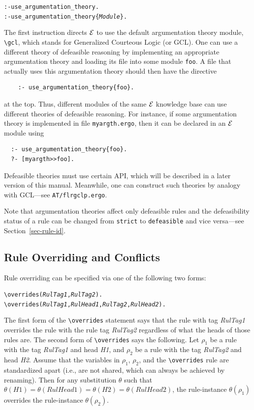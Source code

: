 \documentclass[11pt]{article}
\newcommand{\ERGO}{\mbox{\ensuremath{\cal{E}}\smaller{{\sc{RGO}}}}\xspace}
\newcommand{\FLSYSTEM}{\ERGO}
\newcommand{\ergoext}{ergo\xspace}
\newcommand{\bs}{\textbackslash}
\begin{document}
\begin{alltt}
  :- use_argumentation_theory.
  :- use_argumentation_theory\{\emph{Module}\}.
\end{alltt}
\index{\bs{}gcl module}
The first instruction directs \FLSYSTEM to use the default argumentation theory
module, {\tt \bs{}gcl}, which stands for Generalized Courteous Logic (or GCL).
One can use a different theory of defeasible reasoning by implementing an
appropriate argumentation theory and
loading its file into some module {\tt foo}.
A file that actually uses this argumentation theory should then have
the directive
\begin{verbatim}
    :- use_argumentation_theory{foo}.
\end{verbatim}
at the top. Thus, different modules of the same \FLSYSTEM
knowledge base can use different theories of defeasible reasoning.
For instance, if some argumentation theory is implemented in file
\texttt{myargth.\ergoext}, then it can be declared in an \FLSYSTEM module
using
\begin{verbatim}
  :- use_argumentation_theory{foo}.
  ?- [myargth>>foo].
\end{verbatim}

Defeasible theories must use certain API, which will
be described in a later version of this manual. Meanwhile, one can
construct such theories by analogy with GCL---see {\tt AT/flrgclp.\ergoext}.  

Note that argumentation theories affect only defeasible rules and the
defeasibility status of a rule can be changed from \texttt{strict} to
\texttt{defeasible} and vice versa---see
Section~\ref{sec-rule-id}.

\subsection{Rule Overriding and Conflicts}\label{sec-overriding-conflict}

Rule overriding can be specified via one of the following two forms:
\index{\bs{}overrides predicate}
\begin{alltt}
  \bs{}overrides({\em{}RulTag1},\emph{RulTag2}).
  \bs{}overrides({\em{}RulTag1},{\em{}RulHead1},{\em{}RulTag2},\emph{RulHead2}).
\end{alltt}
The first form of the {\tt \bs{}overrides} statement says that the rule with
tag \emph{RulTag1} overrides the rule with the rule tag
\emph{RulTag2} regardless of what the heads of those rules are. The second
form of {\tt \bs{}overrides} says the following. Let $\rho_1$ be a 
rule with the tag \emph{RulTag1} and head \emph{H1}, and $\rho_2$ be a
rule with the tag \emph{RulTag2} and head \emph{H2}. Assume that
the variables in $\rho_1$, $\rho_2$, and the {\tt \bs{}overrides} rule are
standardized apart (i.e., are not shared, which can always be achieved by
renaming).   Then for any substitution $\theta$ such that $\theta(H1) =
\theta(RulHead1) = \theta(H2) = \theta(RulHead2)$, the rule-instance
$\theta(\rho_1)$ overrides the rule-instance $\theta(\rho_2)$.
\end{document}
